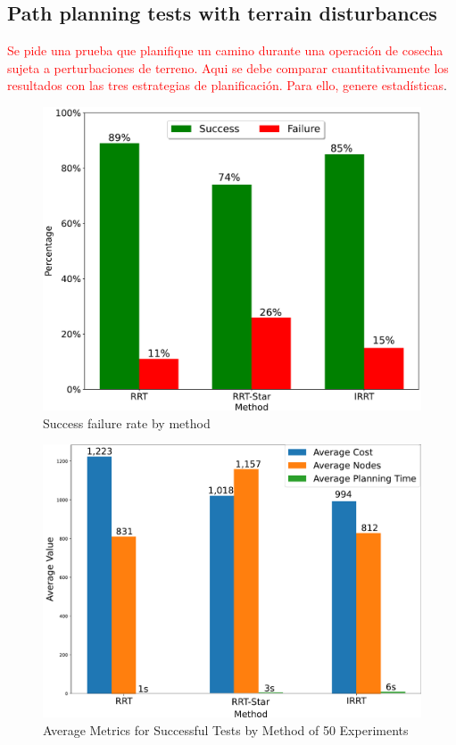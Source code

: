 \documentclass[conference]{IEEEtran}
\newcommand{\revJ}[1]{\textcolor{red}{#1}}
\begin{document}
\subsection{Path planning tests with terrain disturbances}
\label{Sec::test2}
\revJ{Se pide una prueba que planifique un camino durante una operación de cosecha sujeta a perturbaciones de terreno. Aqui se debe comparar cuantitativamente los resultados con las tres estrategias de planificación. Para ello, genere estadísticas}.


\begin{figure}[t!]
        \centering
        \includegraphics[width=\linewidth]{Images/rate_success_rrt_1.pdf}
        \caption{Success failure rate by method}
        \label{fig:test_rrt}
\end{figure}

\begin{figure}[t!]
        \centering
        \includegraphics[width=\linewidth]{Images/report_rrt_1.pdf}
        \caption{Average Metrics for Successful Tests by Method of 50 Experiments}
        \label{fig:test_rrt}
\end{figure}
\end{document}
